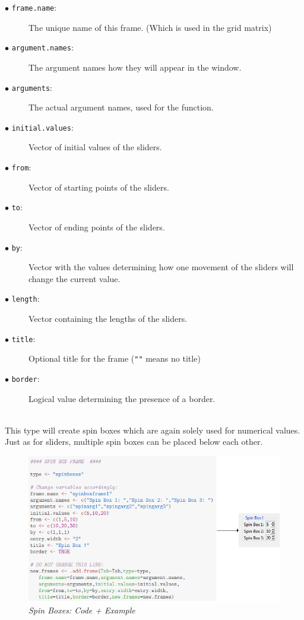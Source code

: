\documentclass[a4paper]{article}\usepackage[]{graphicx}\usepackage[]{color}
\begin{document}
\begin{description}
  \item[$\bullet$ \texttt{frame.name}:] The unique name of this frame. (Which is used in the grid matrix)
  \item[$\bullet$ \texttt{argument.names}:] The argument names how they will
  appear in the window.  
  \item[$\bullet$ \texttt{arguments}:] The actual argument names, used for the
  function.
  \item[$\bullet$ \texttt{initial.values}:] Vector of initial values of the
  sliders.
  \item[$\bullet$ \texttt{from}:] Vector of starting points of the sliders.
  \item[$\bullet$ \texttt{to}:] Vector of ending points of the sliders.
  \item[$\bullet$ \texttt{by}:] Vector with the values determining how one
  movement of the sliders will change the current value.
  \item[$\bullet$ \texttt{length}:] Vector containing the lengths of the
  sliders.
  \item[$\bullet$ \texttt{title}:] Optional title for the frame (\verb|""| means no title)
  \item[$\bullet$ \texttt{border}:] Logical value determining the presence of a
  border.   
  
\end{description}


\\
This type will create spin boxes which are again solely used for numerical
values. Just as for sliders, multiple spin boxes can be placed below each other.

\begin{figure}[H]
\centering
\includegraphics[scale=0.5]{figures/spinboxes.png}
\caption{{\it Spin Boxes: Code + Example}
\label{spinboxes}}
\end{figure}
\end{document}
